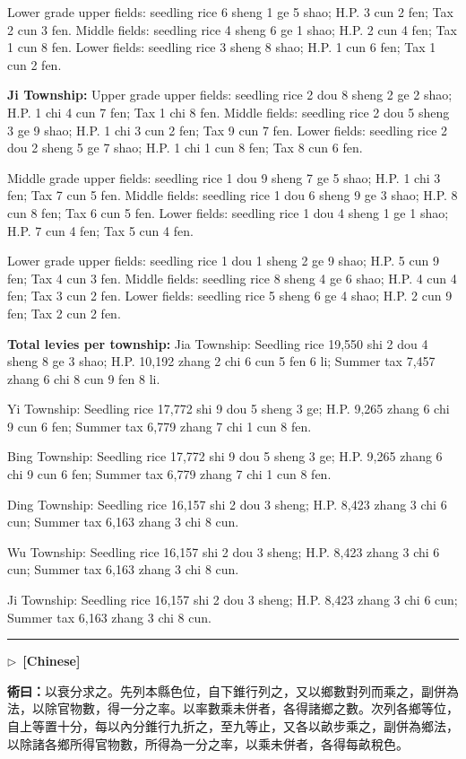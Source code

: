 \documentclass[10pt,a4paper]{article}
\newcommand{\longline}{\par\noindent\rule{\textwidth}{0.4pt}\par}
\newcommand{\CNmarker}{\noindent\textcolor{cnlabel}{$\triangleright$\ \textbf{[Chinese]}}\par}
\newcommand{\Method}[1]{\par\noindent\textbf{\color{methodcolor}術曰：}#1\par}
\begin{document}
{Lower grade upper fields: seedling rice 6 sheng 1 ge 5 shao; H.P. 3 cun 2 fen; Tax 2 cun 3 fen. Middle fields: seedling rice 4 sheng 6 ge 1 shao; H.P. 2 cun 4 fen; Tax 1 cun 8 fen. Lower fields: seedling rice 3 sheng 8 shao; H.P. 1 cun 6 fen; Tax 1 cun 2 fen.

\textbf{Ji Township:} Upper grade upper fields: seedling rice 2 dou 8 sheng 2 ge 2 shao; H.P. 1 chi 4 cun 7 fen; Tax 1 chi 8 fen. Middle fields: seedling rice 2 dou 5 sheng 3 ge 9 shao; H.P. 1 chi 3 cun 2 fen; Tax 9 cun 7 fen. Lower fields: seedling rice 2 dou 2 sheng 5 ge 7 shao; H.P. 1 chi 1 cun 8 fen; Tax 8 cun 6 fen.

Middle grade upper fields: seedling rice 1 dou 9 sheng 7 ge 5 shao; H.P. 1 chi 3 fen; Tax 7 cun 5 fen. Middle fields: seedling rice 1 dou 6 sheng 9 ge 3 shao; H.P. 8 cun 8 fen; Tax 6 cun 5 fen. Lower fields: seedling rice 1 dou 4 sheng 1 ge 1 shao; H.P. 7 cun 4 fen; Tax 5 cun 4 fen.

Lower grade upper fields: seedling rice 1 dou 1 sheng 2 ge 9 shao; H.P. 5 cun 9 fen; Tax 4 cun 3 fen. Middle fields: seedling rice 8 sheng 4 ge 6 shao; H.P. 4 cun 4 fen; Tax 3 cun 2 fen. Lower fields: seedling rice 5 sheng 6 ge 4 shao; H.P. 2 cun 9 fen; Tax 2 cun 2 fen.

\textbf{Total levies per township:}
Jia Township: Seedling rice 19,550 shi 2 dou 4 sheng 8 ge 3 shao; H.P. 10,192 zhang 2 chi 6 cun 5 fen 6 li; Summer tax 7,457 zhang 6 chi 8 cun 9 fen 8 li.

Yi Township: Seedling rice 17,772 shi 9 dou 5 sheng 3 ge; H.P. 9,265 zhang 6 chi 9 cun 6 fen; Summer tax 6,779 zhang 7 chi 1 cun 8 fen.

Bing Township: Seedling rice 17,772 shi 9 dou 5 sheng 3 ge; H.P. 9,265 zhang 6 chi 9 cun 6 fen; Summer tax 6,779 zhang 7 chi 1 cun 8 fen.

Ding Township: Seedling rice 16,157 shi 2 dou 3 sheng; H.P. 8,423 zhang 3 chi 6 cun; Summer tax 6,163 zhang 3 chi 8 cun.

Wu Township: Seedling rice 16,157 shi 2 dou 3 sheng; H.P. 8,423 zhang 3 chi 6 cun; Summer tax 6,163 zhang 3 chi 8 cun.

Ji Township: Seedling rice 16,157 shi 2 dou 3 sheng; H.P. 8,423 zhang 3 chi 6 cun; Summer tax 6,163 zhang 3 chi 8 cun.}

\longline

\CNmarker
\Method{以衰分求之。先列本縣色位，自下錐行列之，又以鄉數對列而乘之，副併為法，以除官物數，得一分之率。以率數乘未併者，各得諸鄉之數。次列各鄉等位，自上等置十分，每以內分錐行九折之，至九等止，又各以畝步乘之，副併為鄉法，以除諸各鄉所得官物數，所得為一分之率，以乘未併者，各得每畝稅色。}
\end{document}

